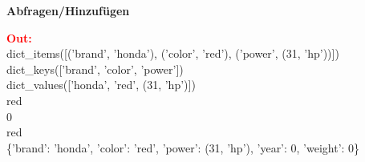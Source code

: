 \hspace{-0.5cm}
\textbf{Abfragen/Hinzufügen}
\\
\begin{minipage}[h]{10cm}
	
\end{minipage}
\begin{minipage}[h]{8cm}
	\textcolor{red}{\textbf{Out:}}
	\\dict\_items([('brand', 'honda'), ('color', 'red'), ('power', (31, 'hp'))])
	\\dict\_keys(['brand', 'color', 'power'])
	\\dict\_values(['honda', 'red', (31, 'hp')])
	\\red
	\\0
	\\red
	\\\{'brand': 'honda', 'color': 'red', 'power': (31, 'hp'), 'year': 0, 'weight': 0\}
\end{minipage}
